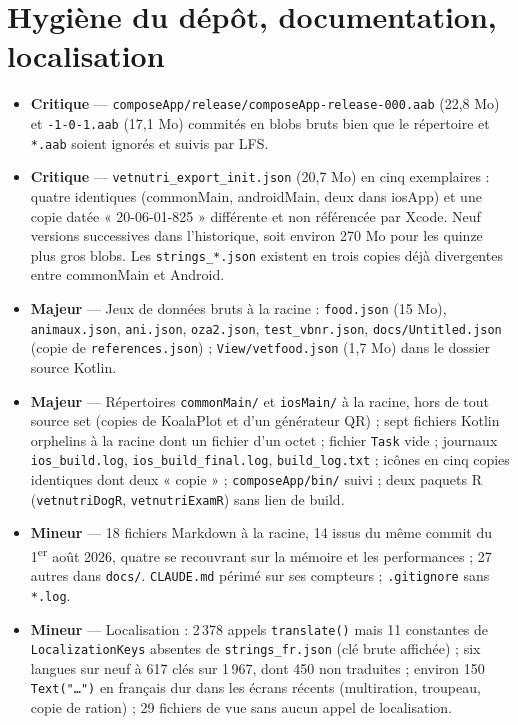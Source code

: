 \documentclass[11pt,a4paper]{article}
\newcommand{\fichier}[1]{\texttt{\small #1}}
\newcommand{\code}[1]{\texttt{#1}}
\newcommand{\sev}[1]{\textbf{#1}}
\begin{document}
\section{Hygiène du dépôt, documentation, localisation}

\begin{itemize}
\item \sev{Critique} --- \fichier{composeApp/release/composeApp-release-000.aab} (22,8 Mo) et
  \fichier{-1-0-1.aab} (17,1 Mo) commités en blobs bruts bien que le répertoire et \code{*.aab}
  soient ignorés et suivis par LFS.
\item \sev{Critique} --- \fichier{vetnutri\_export\_init.json} (20,7 Mo) en cinq exemplaires :
  quatre identiques (commonMain, androidMain, deux dans iosApp) et une copie datée
  « 20-06-01-825 » différente et non référencée par Xcode. Neuf versions successives dans
  l'historique, soit environ 270 Mo pour les quinze plus gros blobs. Les
  \fichier{strings\_*.json} existent en trois copies déjà divergentes entre commonMain et Android.
\item \sev{Majeur} --- Jeux de données bruts à la racine : \fichier{food.json} (15 Mo),
  \fichier{animaux.json}, \fichier{ani.json}, \fichier{oza2.json}, \fichier{test\_vbnr.json},
  \fichier{docs/Untitled.json} (copie de \fichier{references.json}) ;
  \fichier{View/vetfood.json} (1,7 Mo) dans le dossier source Kotlin.
\item \sev{Majeur} --- Répertoires \fichier{commonMain/} et \fichier{iosMain/} à la racine, hors
  de tout source set (copies de KoalaPlot et d'un générateur QR) ; sept fichiers Kotlin orphelins à
  la racine dont un fichier d'un octet ; fichier \fichier{Task} vide ; journaux
  \fichier{ios\_build.log}, \fichier{ios\_build\_final.log}, \fichier{build\_log.txt} ; icônes
  en cinq copies identiques dont deux « copie » ; \fichier{composeApp/bin/} suivi ; deux paquets R
  (\fichier{vetnutriDogR}, \fichier{vetnutriExamR}) sans lien de build.
\item \sev{Mineur} --- 18 fichiers Markdown à la racine, 14 issus du même commit du 1\textsuperscript{er}
  août 2026, quatre se recouvrant sur la mémoire et les performances ; 27 autres dans
  \fichier{docs/}. \fichier{CLAUDE.md} périmé sur ses compteurs ; \fichier{.gitignore} sans
  \code{*.log}.
\item \sev{Mineur} --- Localisation : 2\,378 appels \code{translate()} mais 11 constantes de
  \code{LocalizationKeys} absentes de \fichier{strings\_fr.json} (clé brute affichée) ; six
  langues sur neuf à 617 clés sur 1\,967, dont 450 non traduites ; environ 150 \code{Text("…")} en
  français dur dans les écrans récents (multiration, troupeau, copie de ration) ; 29 fichiers de
  vue sans aucun appel de localisation.
\end{itemize}
\end{document}
